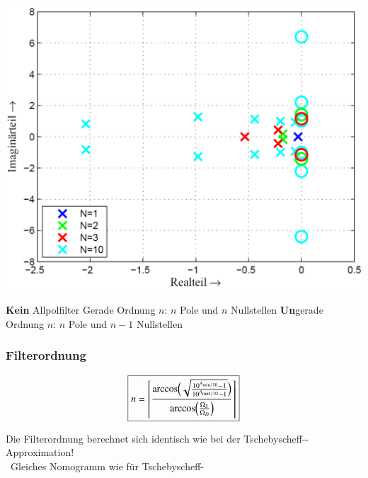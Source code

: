 \begin{minipage}[c]{0.4\columnwidth}
    \includegraphics[width=\columnwidth]{images/filter_tschebyscheff_invers_pollage.png}
\end{minipage}
\hfill
\begin{minipage}[c]{0.58\columnwidth}
    \begin{outline}
        \1 \textbf{Kein} Allpolfilter
            \2 Gerade Ordnung $n$: $n$ Pole und $n$ Nullstellen
            \2 \textbf{Un}gerade Ordnung $n$: $n$ Pole und $n-1$ Nullstellen
    \end{outline}
\end{minipage}


\subsubsection{Filterordnung}

\begin{minipage}[c]{0.4\columnwidth}
    $$ \boxed{ n =  \left\lceil \frac{\arccos \Bigl( \sqrt{ \frac{10^{A_{\rm min / 10}} - 1}{10^{A_{\rm max / 10}} - 1} } \Bigr) }
    {\arccos \Bigl( \frac{\Omega_S}{\Omega_D} \Bigr)}  \right\rceil } $$
\end{minipage}
\hfill
\begin{minipage}[c]{0.58\columnwidth}
    Die Filterordnung berechnet sich identisch wie bei der Tschebyscheff--Approximation! \\
    \textrightarrow\ Gleiches Nomogramm wie für Tschebyscheff-
\end{minipage}



